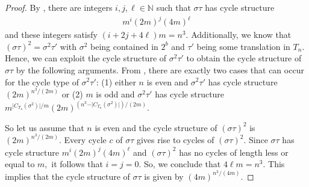 \documentclass[12pt]{article}
\theoremstyle{definition}
\theoremstyle{remark}
\newcommand{\N}{{\mathbb{N}}}
\begin{document}
\begin{proof}
By , there are integers $i,j,\ell\in \N$ such that $\sigma\tau$
has cycle structure \begin{align}\label{cycstruc4}
    m^{i}(2m)^j(4m)^\ell
\end{align}
and these integers satisfy $(i+2j+4\ell)m = n^3.$
Additionally, we know that $(\sigma \tau)^2=\sigma^2\tau'$ with $\sigma^2$ being contained in $2^b$ and $\tau'$ being some translation in $T_n$. Hence, we can exploit the cycle structure of $\sigma^2\tau'$ to obtain the cycle structure of $\sigma\tau$ by the following arguments.
From , there are exactly two cases that can occur for the cycle type of $\sigma^2 \tau'$: (1) either $n$ is even and $\sigma^2 \tau'$ has cycle structure $(2m)^{n^3/(2m)}$ or (2)
 $m$ is odd
and $\sigma^2 \tau'$ has cycle structure  $m^{\vert C_{T_n}(\sigma^2)\vert /m}(2m)^{(n^3-\vert C_{T_n}(\sigma^2)\vert )/(2m)}$.

So let us assume that $n$ is even and the cycle structure of $(\sigma\tau)^2$ is $(2m)^{n^3/(2m)}$. Every cycle $c$ of $\sigma\tau$ gives rise to cycles of $(\sigma \tau)^2.$ Since $\sigma\tau$ has cycle structure $m^{i}(2m)^j(4m)^\ell$ and  $(\sigma\tau)^2 $ has no cycles of length less or equal to $m,$ it follows that $i=j=0$.
 So, we conclude that $4\ell m=n^3$. This implies that the cycle structure of $\sigma\tau$ is given by $(4m)^{n^3/(4m)}$.


\end{proof}
\end{document}
